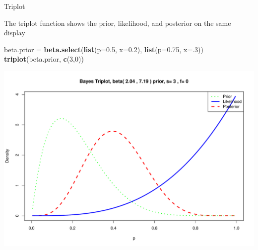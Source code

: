 \documentclass{beamer}
\newenvironment{Shaded}{}{}
\newcommand{\KeywordTok}[1]{\textcolor[rgb]{0.00,0.44,0.13}{\textbf{{#1}}}}
\newcommand{\DataTypeTok}[1]{\textcolor[rgb]{0.56,0.13,0.00}{{#1}}}
\newcommand{\DecValTok}[1]{\textcolor[rgb]{0.25,0.63,0.44}{{#1}}}
\newcommand{\FloatTok}[1]{\textcolor[rgb]{0.25,0.63,0.44}{{#1}}}
\newcommand{\StringTok}[1]{\textcolor[rgb]{0.25,0.44,0.63}{{#1}}}
\newcommand{\NormalTok}[1]{{#1}}
\begin{document}
\begin{frame}[fragile]{Triplot}

The triplot function shows the prior, likelihood, and posterior on the
same display

\begin{Shaded}
\begin{Highlighting}[]
\NormalTok{beta.prior =}\StringTok{ }\KeywordTok{beta.select}\NormalTok{(}\KeywordTok{list}\NormalTok{(}\DataTypeTok{p=}\FloatTok{0.5}\NormalTok{, }\DataTypeTok{x=}\FloatTok{0.2}\NormalTok{), }
\newline\KeywordTok{list}\NormalTok{(}\DataTypeTok{p=}\FloatTok{0.75}\NormalTok{, }\DataTypeTok{x=}\NormalTok{.}\DecValTok{3}\NormalTok{))}
\KeywordTok{triplot}\NormalTok{(beta.prior, }\KeywordTok{c}\NormalTok{(}\DecValTok{3}\NormalTok{,}\DecValTok{0}\NormalTok{))}
\end{Highlighting}
\end{Shaded}

\begin{center}\includegraphics[scale=0.32]{05LearnBayes_files/figure-beamer/unnamed-chunk-3-1} \end{center}

\end{frame}
\end{document}
